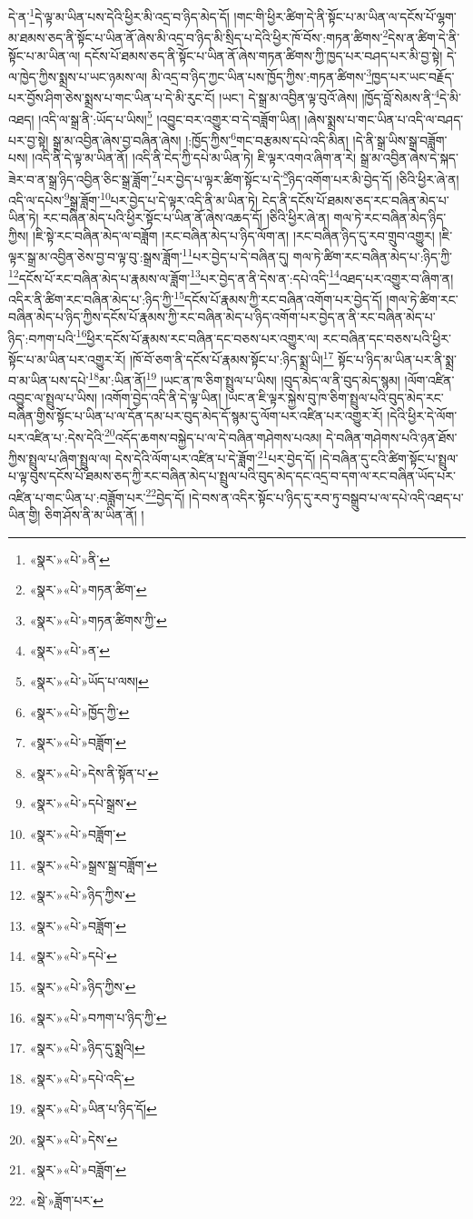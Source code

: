 དེ་ན་\footnote{«སྣར་»«པེ་»ནི་}དེ་ལྟ་མ་ཡིན་པས་དེའི་ཕྱིར་མི་འདྲ་བ་ཉིད་མེད་དོ། །གང་གི་ཕྱིར་ཚིག་དེ་ནི་སྟོང་པ་མ་ཡིན་ལ་དངོས་པོ་ལྷག་མ་ཐམས་ཅད་ནི་སྟོང་པ་ཡིན་ནོ་ཞེས་མི་འདྲ་བ་ཉིད་མི་སྲིད་པ་དེའི་ཕྱིར་ཁོ་བོས་:གཏན་ཚིགས་\footnote{«སྣར་»«པེ་»གཏན་ཚིག་}དེས་ན་ཚིག་དེ་ནི་སྟོང་པ་མ་ཡིན་ལ། དངོས་པོ་ཐམས་ཅད་ནི་སྟོང་པ་ཡིན་ནོ་ཞེས་གཏན་ཚིགས་ཀྱི་ཁྱད་པར་བཤད་པར་མི་བྱ་སྟེ། དེ་ལ་ཁྱེད་ཀྱིས་སྨྲས་པ་ཡང་ཉམས་ལ། མི་འདྲ་བ་ཉིད་ཀྱང་ཡིན་པས་ཁྱོད་ཀྱིས་:གཏན་ཚིགས་\footnote{«སྣར་»«པེ་»གཏན་ཚིགས་ཀྱི་}ཁྱད་པར་ཡང་བརྗོད་པར་བྱོས་ཤིག་ཅེས་སྨྲས་པ་གང་ཡིན་པ་དེ་མི་རུང་ངོ། །ཡང་། དེ་སྒྲ་མ་འབྱིན་ལྟ་བུའོ་ཞེས། །ཁྱོད་བློ་སེམས་ནི་\footnote{«སྣར་»«པེ་»ན་}དེ་མི་འཐད། །འདི་ལ་སྒྲ་ནི་:ཡོད་པ་ཡིས།\footnote{«སྣར་»«པེ་»ཡོད་པ་ལས།} །འབྱུང་བར་འགྱུར་བ་དེ་བཟློག་ཡིན། །ཞེས་སྨྲས་པ་གང་ཡིན་པ་འདི་ལ་བཤད་པར་བྱ་སྟེ། སྒྲ་མ་འབྱིན་ཞེས་བྱ་བཞིན་ཞེས། །:ཁྱོད་ཀྱིས་\footnote{«སྣར་»«པེ་»ཁྱོད་ཀྱི་}གང་བརྩམས་དཔེ་འདི་མིན། །དེ་ནི་སྒྲ་ཡིས་སྒྲ་བཟློག་པས། །འདི་ནི་དེ་ལྟ་མ་ཡིན་ནོ། །འདི་ནི་ངེད་ཀྱི་དཔེ་མ་ཡིན་ཏེ། ཇི་ལྟར་འགའ་ཞིག་ན་རེ། སྒྲ་མ་འབྱིན་ཞེས་དེ་སྐད་ཟེར་བ་ན་སྒྲ་ཉིད་འབྱིན་ཅིང་སྒྲ་ཟློག་\footnote{«སྣར་»«པེ་»བཟློག་}པར་བྱེད་པ་ལྟར་ཚིག་སྟོང་པ་དེ་\footnote{«སྣར་»«པེ་»དེས་ནི་སྟོན་པ་}ཉིད་འགོག་པར་མི་བྱེད་དོ། །ཅིའི་ཕྱིར་ཞེ་ན། འདི་ལ་དཔེས་\footnote{«སྣར་»«པེ་»དཔེ་སྒྲས་}སྒྲ་ཟློག་\footnote{«སྣར་»«པེ་»བཟློག་}པར་བྱེད་པ་དེ་ལྟར་འདི་ནི་མ་ཡིན་ཏེ། ངེད་ནི་དངོས་པོ་ཐམས་ཅད་རང་བཞིན་མེད་པ་ཡིན་ཏེ། རང་བཞིན་མེད་པའི་ཕྱིར་སྟོང་པ་ཡིན་ནོ་ཞེས་འཆད་དོ། །ཅིའི་ཕྱིར་ཞེ་ན། གལ་ཏེ་རང་བཞིན་མེད་ཉིད་ཀྱིས། །ཇི་སྟེ་རང་བཞིན་མེད་ལ་བཟློག །རང་བཞིན་མེད་པ་ཉིད་ལོག་ན། །རང་བཞིན་ཉིད་དུ་རབ་གྲུབ་འགྱུར། །ཇི་ལྟར་སྒྲ་མ་འབྱིན་ཅེས་བྱ་བ་ལྟ་བུ་:སྒྲས་ཟློག་\footnote{«སྣར་»«པེ་»སྒྲས་སྒྲ་བཟློག་}པར་བྱེད་པ་དེ་བཞིན་དུ། གལ་ཏེ་ཚིག་རང་བཞིན་མེད་པ་:ཉིད་ཀྱི་\footnote{«སྣར་»«པེ་»ཉིད་ཀྱིས་}དངོས་པོ་རང་བཞིན་མེད་པ་རྣམས་ལ་ཟློག་\footnote{«སྣར་»«པེ་»བཟློག་}པར་བྱེད་ན་ནི་དེས་ན་:དཔེ་འདི་\footnote{«སྣར་»«པེ་»དཔེ་}འཐད་པར་འགྱུར་བ་ཞིག་ན། འདིར་ནི་ཚིག་རང་བཞིན་མེད་པ་:ཉིད་ཀྱི་\footnote{«སྣར་»«པེ་»ཉིད་ཀྱིས་}དངོས་པོ་རྣམས་ཀྱི་རང་བཞིན་འགོག་པར་བྱེད་དོ། །གལ་ཏེ་ཚིག་རང་བཞིན་མེད་པ་ཉིད་ཀྱིས་དངོས་པོ་རྣམས་ཀྱི་རང་བཞིན་མེད་པ་ཉིད་འགོག་པར་བྱེད་ན་ནི་རང་བཞིན་མེད་པ་ཉིད་:བཀག་པའི་\footnote{«སྣར་»«པེ་»བཀག་པ་ཉིད་ཀྱི་}ཕྱིར་དངོས་པོ་རྣམས་རང་བཞིན་དང་བཅས་པར་འགྱུར་ལ། རང་བཞིན་དང་བཅས་པའི་ཕྱིར་སྟོང་པ་མ་ཡིན་པར་འགྱུར་རོ། །ཁོ་བོ་ཅག་ནི་དངོས་པོ་རྣམས་སྟོང་པ་:ཉིད་སྨྲ་ཡི།\footnote{«སྣར་»«པེ་»ཉིད་དུ་སྨྲའི།} སྟོང་པ་ཉིད་མ་ཡིན་པར་ནི་སྨྲ་བ་མ་ཡིན་པས་དཔེ་\footnote{«སྣར་»«པེ་»དཔེ་འདི་}མ་:ཡིན་ནོ།\footnote{«སྣར་»«པེ་»ཡིན་པ་ཉིད་དོ།} །ཡང་ན་ཁ་ཅིག་སྤྲུལ་པ་ཡིས། །བུད་མེད་ལ་ནི་བུད་མེད་སྙམ། །ལོག་འཛིན་འབྱུང་ལ་སྤྲུལ་པ་ཡིས། །འགོག་བྱེད་འདི་ནི་དེ་ལྟ་ཡིན། །ཡང་ན་ཇི་ལྟར་སྐྱེས་བུ་ཁ་ཅིག་སྤྲུལ་པའི་བུད་མེད་རང་བཞིན་གྱིས་སྟོང་པ་ཡིན་པ་ལ་དོན་དམ་པར་བུད་མེད་དོ་སྙམ་དུ་ལོག་པར་འཛིན་པར་འགྱུར་རོ། །དེའི་ཕྱིར་དེ་ལོག་པར་འཛིན་པ་:དེས་དེའི་\footnote{«སྣར་»«པེ་»དེས་}འདོད་ཆགས་བསྐྱེད་པ་ལ་དེ་བཞིན་གཤེགས་པའམ། དེ་བཞིན་གཤེགས་པའི་ཉན་ཐོས་ཀྱིས་སྤྲུལ་པ་ཞིག་སྤྲུལ་ལ། དེས་དེའི་ལོག་པར་འཛིན་པ་དེ་ཟློག་\footnote{«སྣར་»«པེ་»བཟློག་}པར་བྱེད་དོ། །དེ་བཞིན་དུ་ངའི་ཚིག་སྟོང་པ་སྤྲུལ་པ་ལྟ་བུས་དངོས་པོ་ཐམས་ཅད་ཀྱི་རང་བཞིན་མེད་པ་སྤྲུལ་པའི་བུད་མེད་དང་འདྲ་བ་དག་ལ་རང་བཞིན་ཡོད་པར་འཛིན་པ་གང་ཡིན་པ་:བཟློག་པར་\footnote{«སྡེ་»ཟློག་པར་}བྱེད་དོ། །དེ་བས་ན་འདིར་སྟོང་པ་ཉིད་དུ་རབ་ཏུ་བསྒྲུབ་པ་ལ་དཔེ་འདི་འཐད་པ་ཡིན་གྱི། ཅིག་ཤོས་ནི་མ་ཡིན་ནོ། །
